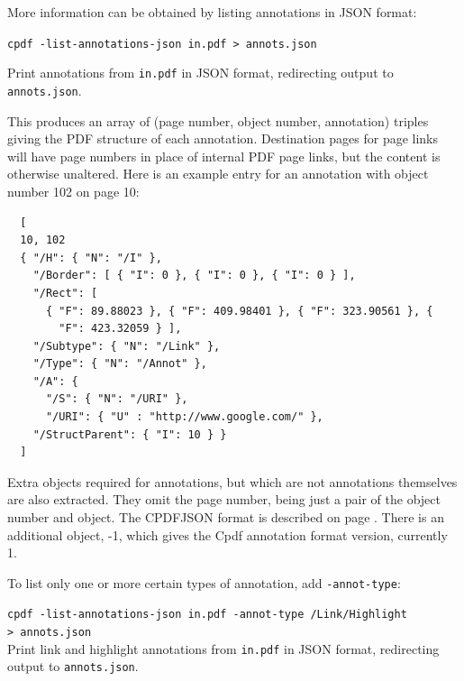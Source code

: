 \documentclass{book}
\begin{document}
\noindent More information can be obtained by listing annotations in JSON format:

  \begin{framed}
    \noindent\small\verb!cpdf -list-annotations-json in.pdf > annots.json!
    
    \vspace{2.5mm}
    \noindent Print annotations from \texttt{in.pdf} in JSON format, redirecting output to \texttt{annots.json}.
  \end{framed}

\noindent This produces an array of (page number, object number, annotation) triples giving the PDF structure of each annotation. Destination pages for page links will have page numbers in place of internal PDF page links, but the content is otherwise unaltered. Here is an example entry for an annotation with object number 102 on page 10:

{\small\begin{verbatim}
  [
  10, 102
  { "/H": { "N": "/I" },
    "/Border": [ { "I": 0 }, { "I": 0 }, { "I": 0 } ],
    "/Rect": [
      { "F": 89.88023 }, { "F": 409.98401 }, { "F": 323.90561 }, {
        "F": 423.32059 } ],
    "/Subtype": { "N": "/Link" },
    "/Type": { "N": "/Annot" },
    "/A": {
      "/S": { "N": "/URI" },
      "/URI": { "U" : "http://www.google.com/" },
    "/StructParent": { "I": 10 } }
  ]
\end{verbatim}}

\noindent Extra objects required for annotations, but which are not annotations themselves are also extracted. They omit the page number, being just a pair of the object number and object. The CPDFJSON format is described on page \pageref{cpdfjson}. There is an additional object, -1, which gives the Cpdf annotation format version, currently 1.

To list only one or more certain types of annotation, add \texttt{-annot-type}:

  \begin{framed}
    \noindent\small\verb!cpdf -list-annotations-json in.pdf -annot-type /Link/Highlight!\\
    \noindent\small\verb!> annots.json!\\
    
    \vspace{2.5mm}
    \noindent Print link and highlight annotations from \texttt{in.pdf} in JSON format, redirecting output to \texttt{annots.json}.
  \end{framed}
\end{document}

